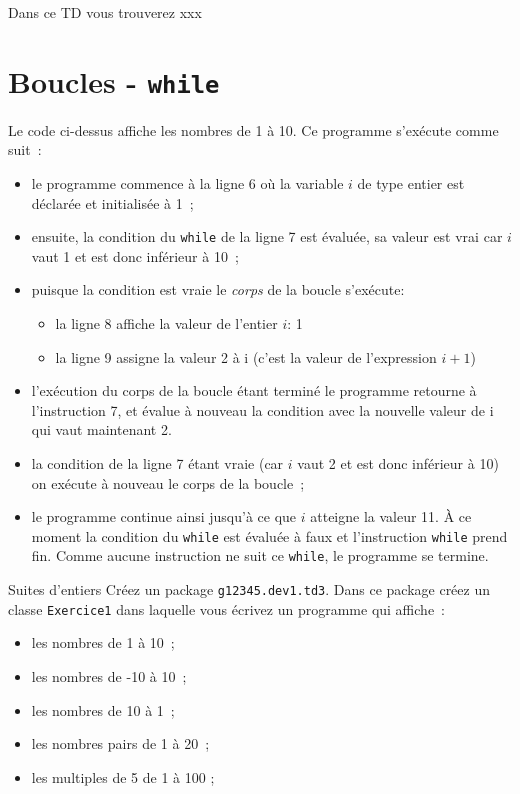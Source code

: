 \documentclass[a4paper,11pt]{article}
\date{2018 -- 2019}
\begin{document}
\entete
\titre
{}
\lastedit


	Dans ce TD vous trouverez xxx
	\tableofcontents

	\newpage

\section{Boucles - \texttt{while}}

	Le code ci-dessus affiche les nombres de 1 à 10.
	Ce programme s'exécute comme suit~:
	\begin{itemize}
		\item  le programme commence à la ligne 6 où la variable $i$ de type entier est déclarée et initialisée à 1~;
		\item  ensuite, la condition du \texttt{while} de la ligne 7 est évaluée, sa valeur est vrai car $i$ vaut 1 et est donc inférieur à 10~;
		\item puisque la condition est vraie le \emph{corps} de la boucle s'exécute:
			\begin{itemize}
				\item la ligne 8 affiche la valeur de l'entier $i$: 1
				\item la ligne 9 assigne la valeur 2 à i (c'est la valeur de l'expression $i+1$)
			\end{itemize}
		\item l'exécution du corps de la boucle étant terminé le programme retourne à l'instruction 7, 
			et évalue à nouveau la condition avec la nouvelle valeur de i qui vaut maintenant 2.
		\item  la condition de la ligne 7 étant vraie (car $i$ vaut 2 et est donc inférieur à 10) on exécute à nouveau le corps de la boucle~;
		\item le programme continue ainsi jusqu'à ce que $i$ atteigne la valeur 11. 
			\`A ce moment la condition du \texttt{while} est évaluée à faux et l'instruction 
			\texttt{while} prend fin.
			Comme aucune instruction ne suit ce \texttt{while}, le programme se termine.
	\end{itemize}


	\begin{Exercice}{Suites d'entiers}	\label{ex1}
		Créez un package \texttt{g12345.dev1.td3}.
		Dans ce package créez un classe \texttt{Exercice1} dans laquelle vous 
		écrivez un programme qui affiche~:
		\begin{itemize}
			\item les nombres de 1 à 10~;
			\item les nombres de -10 à 10~;
			\item les nombres de 10 à 1~;
			\item les nombres pairs de 1 à 20~;
			\item les multiples de 5 de 1 à 100 ;
		\end{itemize}
	\end{Exercice}
 
\end{document}
